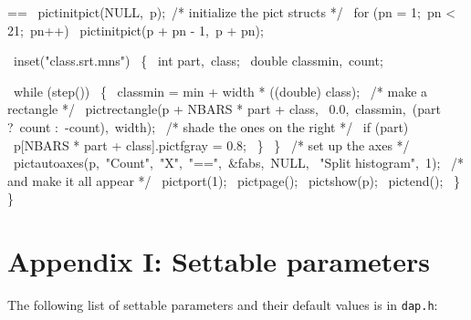 \documentclass{book}
\makeatletter
\newenvironment{Texinfopreformatted}{%
  \par\GNUTobeylines\obeyspaces\frenchspacing\parskip=\z@\parindent=\z@}{}
{\catcode`\^^M=13 \gdef\GNUTobeylines{\catcode`\^^M=13 \def^^M{\null\par}}}
\newenvironment{Texinfoindented}{\begin{list}{}{}\item\relax}{\end{list}}
\renewcommand{\_}{\Texinfounderscore\discretionary{}{}{}}
\makeatother
\begin{document}
\begin{Texinfoindented}
\begin{Texinfopreformatted}
\  pict\_initpict(NULL,\ p);\  /* initialize the pict structs */
\  for (pn = 1;\ pn < 21;\ pn++)
\    pict\_initpict(p + pn - 1,\ p + pn);

\  inset("class.srt.mns")
\    \{
\      int part,\ class;
\      double classmin,\ count;

\      while (step())
\        \{
\          classmin = min + width * ((double) class);
\          /* make a rectangle */
\          pict\_rectangle(p + NBARS * part + class,
\              0.0,\ classmin,\ (part ?\ count :\ -count),\ width);
\          /* shade the ones on the right */
\          if (part)
\            p[NBARS * part + class].pict\_fgray = 0.8;
\        \}
\    \}
\  /* set up the axes */
\  pict\_autoaxes(p,\ "Count",\ "X",\ "==",\ \&fabs,\ NULL,
\                          "Split histogram",\ 1);
\  /* and make it all appear */
\  pict\_port(1);
\  pict\_page();
\  pict\_show(p);
\  pict\_end();
\  \}
\}
\end{Texinfopreformatted}
\end{Texinfoindented}

\chapter*{{Appendix I: Settable parameters}}
\label{anchor:Appendix-I}%

The following list of settable parameters and their
default values is in \texttt{dap.h}:
%
%
%
%
\end{document}
